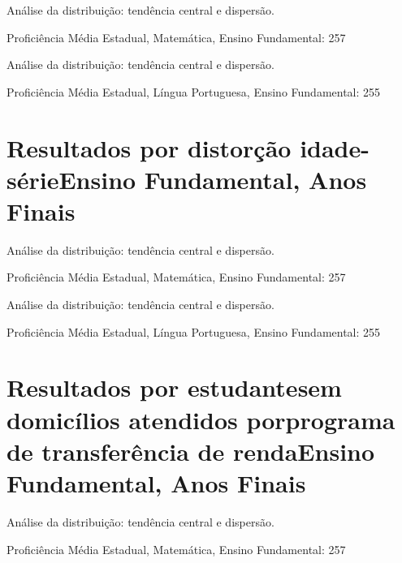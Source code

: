 \documentclass[
  ignorenonframetext,
]{beamer}
\begin{document}
\begin{frame}
Análise da distribuição: tendência central e dispersão.

Proficiência Média Estadual, Matemática, Ensino Fundamental: 257
\end{frame}

\begin{frame}
Análise da distribuição: tendência central e dispersão.

Proficiência Média Estadual, Língua Portuguesa, Ensino Fundamental: 255
\end{frame}

\hypertarget{resultados-por-distoruxe7uxe3o-idade-suxe9rie-ensino-fundamental-anos-finais}{%
\section{\texorpdfstring{Resultados por distorção idade-sérieEnsino
Fundamental, Anos
Finais}{Resultados por distorção idade-série  Ensino Fundamental, Anos Finais}}\label{resultados-por-distoruxe7uxe3o-idade-suxe9rie-ensino-fundamental-anos-finais}}

\begin{frame}
Análise da distribuição: tendência central e dispersão.

Proficiência Média Estadual, Matemática, Ensino Fundamental: 257
\end{frame}

\begin{frame}
Análise da distribuição: tendência central e dispersão.

Proficiência Média Estadual, Língua Portuguesa, Ensino Fundamental: 255
\end{frame}

\hypertarget{resultados-por-estudantes-em-domicuxedlios-atendidos-por-programa-de-transferuxeancia-de-renda-ensino-fundamental-anos-finais}{%
\section{\texorpdfstring{Resultados por estudantesem domicílios
atendidos porprograma de transferência de rendaEnsino Fundamental, Anos
Finais}{Resultados por estudantes em domicílios atendidos por programa de transferência de renda  Ensino Fundamental, Anos Finais}}\label{resultados-por-estudantes-em-domicuxedlios-atendidos-por-programa-de-transferuxeancia-de-renda-ensino-fundamental-anos-finais}}

\begin{frame}
Análise da distribuição: tendência central e dispersão.

Proficiência Média Estadual, Matemática, Ensino Fundamental: 257
\end{frame}
\end{document}

